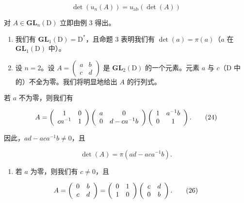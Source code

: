 \[
\det (u _ {n} (A)) = u _ {\mathrm{ab}} (\det (A))\tag{23}
\]

对 \(A \in \mathbf{GL}_n(\mathrm{D})\) 立即由例 3 得出。

\begin{enumerate}
\def\labelenumi{\arabic{enumi})}
\setcounter{enumi}{4}
\item
  我们有 \(\mathbf{GL}_1(\mathrm{D}) = \mathrm{D}^*\)，且命题 3 表明我们有 \(\det(a) = \pi(a)\)（\(a\) 在 \(\mathbf{GL}_1(\mathrm{D})\) 中）。
\item
  设 \(n = 2\)。设 \(A = \begin{pmatrix} a & b \\ c & d \end{pmatrix}\) 是 \(\mathbf{GL}_2(\mathrm{D})\) 的一个元素。元素 \(a\) 与 \(c\)（\(\mathrm{D}\) 中的）不全为零。我们将明显地给出 \(A\) 的行列式。
\end{enumerate}

若 \(a\) 不为零，则我们有

\[
A = \left( \begin{array}{c c} 1 & 0 \\ c a ^ {- 1} & 1 \end{array} \right) \left( \begin{array}{c c} a & 0 \\ 0 & d - c a ^ {- 1} b \end{array} \right) \left( \begin{array}{c c} 1 & a ^ {- 1} b \\ 0 & 1 \end{array} \right).\tag{24}
\]

因此，\(ad - aca^{-1}b \neq 0\)，且

\[
\det (A) = \pi (a d - a c a ^ {- 1} b).\tag{25}
\]

\begin{enumerate}
\def\labelenumi{\alph{enumi})}
\setcounter{enumi}{1}
\tightlist
\item
  若 \(a\) 为零，则我们有 \(c \neq 0\)，且
\end{enumerate}

\[
A = \left( \begin{array}{c c} 0 & b \\ c & d \end{array} \right) = \left( \begin{array}{c c} 0 & 1 \\ 1 & 0 \end{array} \right) \left( \begin{array}{c c} c & d \\ 0 & b \end{array} \right).\tag{26}
\]

